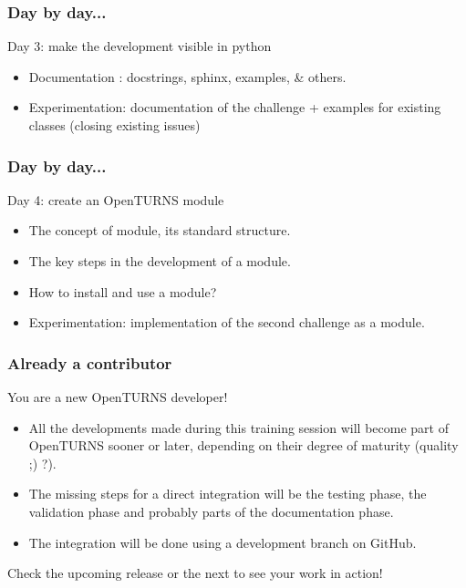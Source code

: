 \documentclass{beamer}
\begin{document}
\begin{frame}
  \frametitle{Day by day...}
  \begin{block}{Day 3: make the development visible in python}
    \begin{itemize}
    \item Documentation : docstrings, sphinx, examples, \& others.
    \item Experimentation: documentation of the challenge + examples for existing classes (closing existing issues)
    \end{itemize}
  \end{block}
\end{frame}
\begin{frame}
  \frametitle{Day by day...}
  \begin{block}{Day 4: create an OpenTURNS module}
    \begin{itemize}
    \item The concept of module, its standard structure.
    \item The key steps in the development of a module.
    \item How to install and use a module?
    \item Experimentation: implementation of the second challenge as a module.
    \end{itemize}
  \end{block}
\end{frame}
\begin{frame}
  \frametitle{Already a contributor}
  \begin{block}{You are a new OpenTURNS developer!}
    \begin{itemize}
    \item All the developments made during this training session will become part of OpenTURNS sooner or later, depending on their degree of maturity (quality ;) ?).
    \item The missing steps for a direct integration will be the testing phase, the validation phase and probably parts of the documentation phase.
    \item The integration will be done using a development branch on GitHub.
    \end{itemize}
    Check the upcoming release or the next to see your work in action!
  \end{block}
\end{frame}
\end{document}
